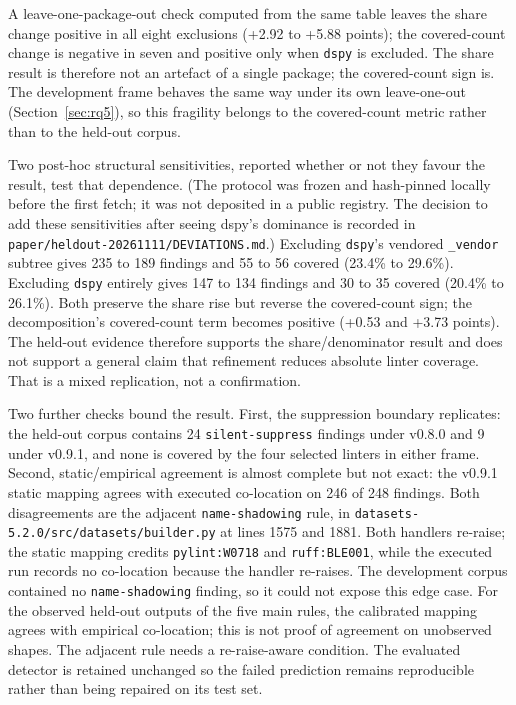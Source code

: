 \documentclass[10pt,a4paper]{article}
\begin{document}
A leave-one-package-out check computed from the same table leaves the share
change positive in all eight exclusions (+2.92 to +5.88 points); the
covered-count change is negative in seven and positive only when
\texttt{dspy} is excluded. The share result is therefore not an artefact of a
single package; the covered-count sign is. The development frame behaves the
same way under its own leave-one-out (Section~\ref{sec:rq5}), so this
fragility belongs to the covered-count metric rather than to the held-out
corpus.

Two post-hoc structural sensitivities, reported whether or not they favour the
result, test that dependence. (The protocol was frozen and hash-pinned
locally before the first fetch; it was not deposited in a public registry.
The decision to add these sensitivities after seeing dspy's dominance is
recorded in \texttt{paper/heldout-20261111/DEVIATIONS.md}.) Excluding \texttt{dspy}'s
vendored \texttt{\_vendor} subtree gives 235 to 189 findings and 55 to 56
covered (23.4\% to 29.6\%). Excluding \texttt{dspy} entirely gives 147 to 134
findings and 30 to 35 covered (20.4\% to 26.1\%). Both preserve the share rise
but reverse the covered-count sign; the decomposition's covered-count term
becomes positive (+0.53 and +3.73 points). The held-out evidence therefore
supports the share/denominator result and does not support a general claim that
refinement reduces absolute linter coverage. That is a mixed replication, not a
confirmation.

Two further checks bound the result. First, the suppression boundary replicates:
the held-out corpus contains 24 \texttt{silent-suppress} findings under v0.8.0
and 9 under v0.9.1, and none is covered by the four selected linters in either
frame. Second, static/empirical agreement is almost complete but not exact:
the v0.9.1 static mapping agrees with executed co-location on 246 of 248
findings. Both disagreements are the adjacent \texttt{name-shadowing} rule, in
\texttt{datasets-5.2.0/src/datasets/builder.py} at lines 1575 and 1881. Both
handlers re-raise; the static mapping credits \texttt{pylint:W0718} and
\texttt{ruff:BLE001}, while the executed run records no co-location because the
handler re-raises. The development corpus contained no \texttt{name-shadowing}
finding, so it could not expose this edge case. For the observed held-out outputs of the five main rules, the calibrated
mapping agrees with empirical co-location; this is not proof of agreement
on unobserved shapes. The adjacent rule needs a re-raise-aware condition.
The evaluated detector is retained unchanged so the failed prediction remains
reproducible rather than being repaired on its test set.
\end{document}
